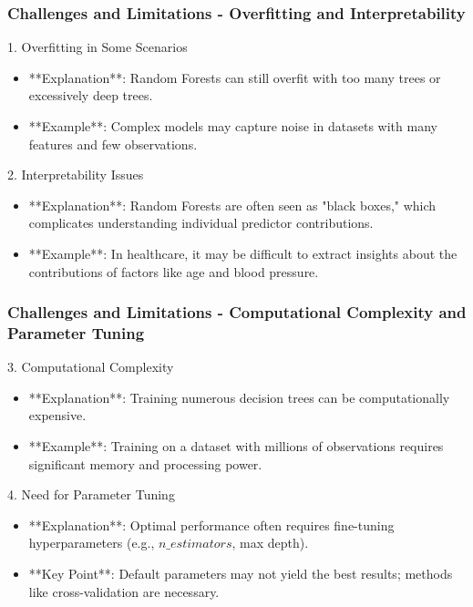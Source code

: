 \documentclass[aspectratio=169]{beamer}
\begin{document}
\begin{frame}[fragile]
    \frametitle{Challenges and Limitations - Overfitting and Interpretability}
    \begin{block}{1. Overfitting in Some Scenarios}
        \begin{itemize}
            \item **Explanation**: Random Forests can still overfit with too many trees or excessively deep trees.
            \item **Example**: Complex models may capture noise in datasets with many features and few observations.
        \end{itemize}
    \end{block}

    \begin{block}{2. Interpretability Issues}
        \begin{itemize}
            \item **Explanation**: Random Forests are often seen as "black boxes," which complicates understanding individual predictor contributions.
            \item **Example**: In healthcare, it may be difficult to extract insights about the contributions of factors like age and blood pressure.
        \end{itemize}
    \end{block}
\end{frame}

\begin{frame}[fragile]
    \frametitle{Challenges and Limitations - Computational Complexity and Parameter Tuning}
    \begin{block}{3. Computational Complexity}
        \begin{itemize}
            \item **Explanation**: Training numerous decision trees can be computationally expensive.
            \item **Example**: Training on a dataset with millions of observations requires significant memory and processing power.
        \end{itemize}
    \end{block}

    \begin{block}{4. Need for Parameter Tuning}
        \begin{itemize}
            \item **Explanation**: Optimal performance often requires fine-tuning hyperparameters (e.g., $n\_estimators$, max depth).
            \item **Key Point**: Default parameters may not yield the best results; methods like cross-validation are necessary.
        \end{itemize}
    \end{block}
\end{frame}
\end{document}
